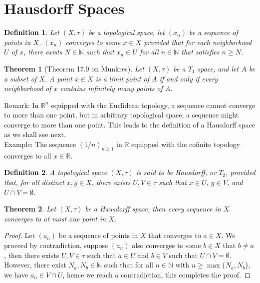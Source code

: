 \documentclass[11pt]{book}
\theoremstyle{break}
\theoremstyle{break}
\newtheorem{thm}{Theorem}[section]
\newtheorem{defn}{Definition}[corL]
\newcommand{\R}{\mathbb{R}}
\newcommand{\N}{\mathbb{N}}
\newcommand{\remark}{\color{blue}Remark: \color{black}}
\newcommand{\example}{\color{green}Example: \color{black}}
\begin{document}
\newpage
\section[Hausdorff Spaces]{\color{red}Hausdorff Spaces\color{black} }
\begin{defn}
Let $(X,\tau)$ be a topological space, let $(x_n)$ be a sequence of points in $X$. $(x_n)$ converges to some $x \in X$ provided that for each neighborhood $U$ of $x$, there exists $N \in \N$ such that $x_n \in U$ for all $n\in \N$ that satisfies $n\geq N$. 
\end{defn}

\begin{thm}[Theorem 17.9 on Munkres]
Let $(X,\tau)$ be a $T_1$ space, and let $A$ be a subset of $X$. A point $x \in X$ is a limit point of $A$ if and only if every neighborhood of $x$ contains infinitely many points of $A$. 
\end{thm}


\remark In $\R^n$ equipped with the Euclidean topology, a sequence cannot converge to more than one point, but in arbitrary topological space, a sequence might converge to more than one point. This leads to the definition of a Hausdorff space as we shall see next.\\

\example The sequence $(1/n)_{n\geq 1}$ in $\R$ equipped with the cofinite topology converges to all $x \in \R$. 

\begin{defn}
A topological space $(X,\tau)$ is said to be Hausdorff, or $T_2$, provided that, for all distinct $x,y \in X$, there exists $U,V \in \tau$ such that $x \in U$, $y \in V$, and $U\cap V = \emptyset$.
\end{defn}

\begin{thm}
Let $(X,\tau)$ be a Hausdorff space, then every sequence in $X$ converges to at most one point in $X$.
\end{thm}
\begin{proof}
Let $(a_n)$ be a sequence of points in $X$ that converges to $a \in X$. We proceed by contradiction, suppose $(a_n)$ also converges to some $b \in X$ that $b\neq a$, then there exists $U,V \in \tau$ such that $a\in U$ and $b \in V$ such that $U\cap V =\emptyset$. However, there exist $N_a,N_b \in \N$ such that for all $n \in \N$ with $n\geq \max\{N_a,N_b\}$, we have $a_n \in V\cap U$, hence we reach a contradiction, this completes the proof. 
\end{proof}
\end{document}
